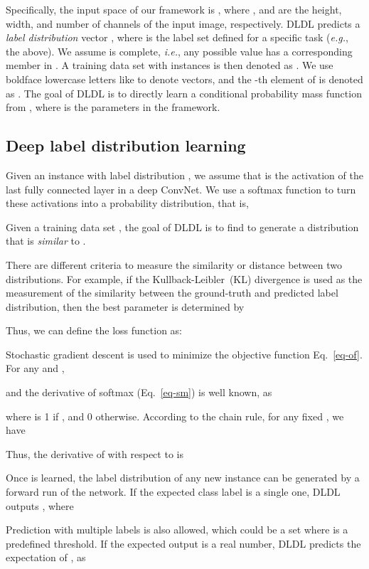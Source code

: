 \documentclass[journal]{IEEEtran}
\begin{document}
Specifically, the input space of our framework is , where ,  and  are the height, width, and number of channels of the input image, respectively. DLDL predicts a \emph{label distribution} vector , where  is the label set defined for a specific task (\emph{e.g.}, the  above). We assume  is complete, \emph{i.e.}, any possible  value has a corresponding member in . A training data set with  instances is then denoted as . We use boldface lowercase letters like  to denote vectors, and the -th element of  is denoted as . The goal of DLDL is to directly learn a conditional probability mass function  from , where  is the parameters in the framework.

\subsection{Deep label distribution learning} \label{sec:udldl}

Given an instance  with label distribution , we assume that  is the activation of the last fully connected layer in a deep ConvNet. We use a softmax function to turn these activations into a probability distribution, that is,

Given a training data set , the goal of DLDL is to find  to generate a distribution  that is \emph{similar} to .

There are different criteria to measure the similarity or distance between two distributions. For example, if the Kullback-Leibler~(KL) divergence is used as the measurement of the similarity between the ground-truth and predicted label distribution, then the best parameter  is determined by

Thus, we can define the loss function as:

Stochastic gradient descent is used to minimize the objective function Eq.~\ref{eq-of}. For any  and ,

and the derivative of softmax (Eq.~\ref{eq-sm}) is well known, as

where  is 1 if , and 0 otherwise.
According to the chain rule, for any fixed , we have

Thus, the derivative of  with respect to  is


Once  is learned, the label distribution  of any new instance  can be generated by a forward run of the network. If the expected class label is a single one, DLDL outputs , where

Prediction with multiple labels is also allowed, which could be a set  where  is a predefined threshold. If the expected output is a real number, DLDL predicts the expectation of , as
\end{document}
